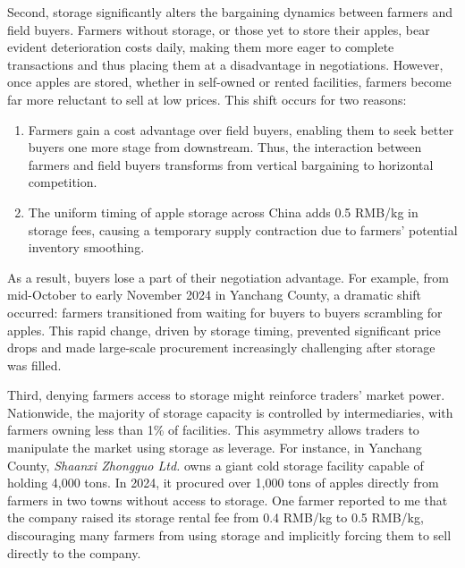 Second, storage significantly alters the bargaining dynamics between farmers and field buyers. Farmers without storage, or those yet to store their apples, bear evident deterioration costs daily, making them more eager to complete transactions and thus placing them at a disadvantage in negotiations. However, once apples are stored, whether in self-owned or rented facilities, farmers become far more reluctant to sell at low prices. This shift occurs for two reasons: 
\begin{enumerate}
    \item Farmers gain a cost advantage over field buyers, enabling them to seek better buyers one more stage from downstream. Thus, the interaction between farmers and field buyers transforms from vertical bargaining to horizontal competition.
    \item The uniform timing of apple storage across China adds 0.5 RMB/kg in storage fees, causing a temporary supply contraction due to farmers’ potential inventory smoothing.
\end{enumerate}
As a result, buyers lose a part of their negotiation advantage. For example, from mid-October to early November 2024 in Yanchang County, a dramatic shift occurred: farmers transitioned from waiting for buyers to buyers scrambling for apples. This rapid change, driven by storage timing, prevented significant price drops and made large-scale procurement increasingly challenging after storage was filled.

Third, denying farmers access to storage might reinforce traders' market power. Nationwide, the majority of storage capacity is controlled by intermediaries, with farmers owning less than 1\% of facilities. This asymmetry allows traders to manipulate the market using storage as leverage. For instance, in Yanchang County, \textit{Shaanxi Zhongguo Ltd.} owns a giant cold storage facility capable of holding 4,000 tons. In 2024, it procured over 1,000 tons of apples directly from farmers in two towns without access to storage. One farmer reported to me that the company raised its storage rental fee from 0.4 RMB/kg to 0.5 RMB/kg, discouraging many farmers from using storage and implicitly forcing them to sell directly to the company.

